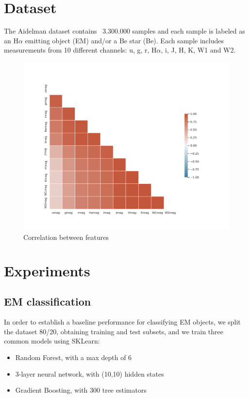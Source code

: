 \documentclass{article}
\begin{document}
\section{Dataset}
The Aidelman dataset contains ~3.300.000 samples and each sample is labeled as an H$α$ emitting object (EM) and/or a Be star (Be). Each sample includes measurements from 10 different channels: u, g, r, H$α$, i, J, H, K, W1 and W2.


\begin{figure}
    \includegraphics[width=1\linewidth]{reports/aidelman/correlation.png}
    \caption{Correlation between features}
\end{figure}

\section{Experiments}

\subsection{EM classification}
In order to establish a baseline performance for classifying EM objects, we split the dataset 80/20, obtaining training and test subsets, and we train three common models using SKLearn:

\begin{itemize}
    \item Random Forest, with a max depth of 6
    \item 3-layer neural network, with (10,10) hidden states
    \item Gradient Boosting, with 300 tree estimators
\end{itemize}
\end{document}
